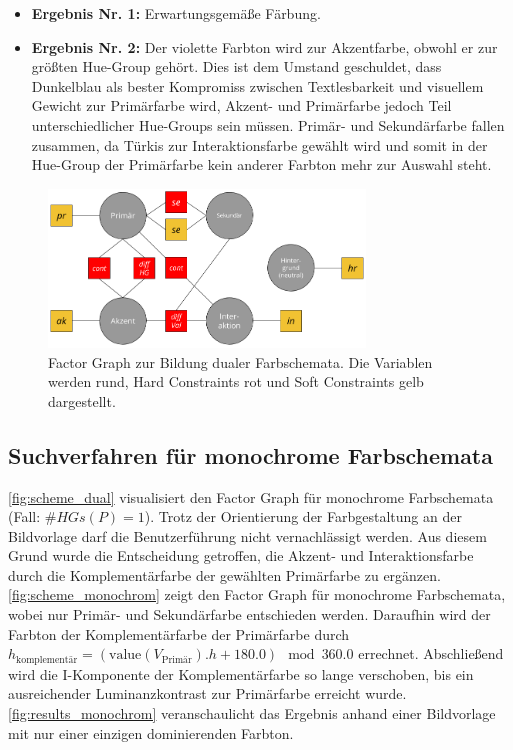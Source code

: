  \begin{itemize}
	\item \textbf{Ergebnis Nr. 1:} Erwartungsgemäße Färbung.
	\item \textbf{Ergebnis Nr. 2:} Der violette Farbton wird zur Akzentfarbe, obwohl er zur größten Hue-Group gehört. Dies ist dem Umstand geschuldet, dass Dunkelblau als bester Kompromiss zwischen Textlesbarkeit und visuellem Gewicht zur Primärfarbe wird, Akzent- und Primärfarbe jedoch Teil unterschiedlicher Hue-Groups sein müssen. Primär- und Sekundärfarbe fallen zusammen, da Türkis zur Interaktionsfarbe gewählt wird und somit in der Hue-Group der Primärfarbe kein anderer Farbton mehr zur Auswahl steht.
\end{itemize}
 
\begin{figure}[h]
\centering
\includegraphics[width=0.75\textwidth]{img/scheme_dual.png}
\caption{Factor Graph zur Bildung dualer Farbschemata. Die Variablen werden rund, Hard Constraints rot und Soft Constraints gelb dargestellt.}
\label{fig:scheme_dual}
\end{figure}

\subsection{Suchverfahren für monochrome Farbschemata}

\autoref{fig:scheme_dual} visualisiert den Factor Graph für monochrome Farbschemata (Fall: $\#HGs(P) = 1$). Trotz der Orientierung der Farbgestaltung an der Bildvorlage darf die Benutzerführung nicht vernachlässigt werden. Aus diesem Grund wurde die Entscheidung getroffen, die Akzent- und Interaktionsfarbe durch die Komplementärfarbe der gewählten Primärfarbe zu ergänzen. \autoref{fig:scheme_monochrom} zeigt den Factor Graph für monochrome Farbschemata, wobei nur Primär- und Sekundärfarbe entschieden werden. Daraufhin wird der Farbton der Komplementärfarbe der Primärfarbe durch $h_\text{komplementär} = (\text{value}(V_\text{Primär}).h + 180.0) \mod 360.0$ errechnet. Abschließend wird die I-Komponente der Komplementärfarbe so lange verschoben, bis ein ausreichender Luminanzkontrast zur Primärfarbe erreicht wurde. \autoref{fig:results_monochrom} veranschaulicht das Ergebnis anhand einer Bildvorlage mit nur einer einzigen dominierenden Farbton.

